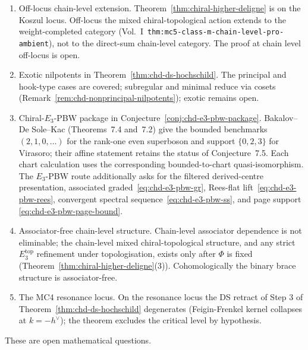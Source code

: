 \begin{enumerate}
\item Off-locus chain-level extension. Theorem~\ref{thm:chiral-higher-deligne}
is on the Koszul locus. Off-locus the mixed chiral-topological action
extends to the
weight-completed category (Vol.~I~\texttt{thm:mc5-class-m-chain-level-pro-ambient}),
not to the direct-sum chain-level category. The proof at chain level
off-locus is open.

\item Exotic nilpotents in Theorem~\ref{thm:chd-ds-hochschild}. The
principal and hook-type cases are covered; subregular and minimal
reduce via cosets (Remark~\ref{rem:chd-nonprincipal-nilpotents}); exotic
remains open.

\item Chiral-$E_3$-PBW package in
Conjecture~\ref{conj:chd-e3-pbw-package}. Bakalov--De Sole--Kac
\cite{BDSK21} \textup{(}Theorems~7.4 and~7.2\textup{)} give the bounded
benchmarks $(2,1,0,\ldots)$ for the rank-one even superboson and
support $\{0,2,3\}$ for Virasoro; their affine statement retains the
status of Conjecture~7.5. Each chart calculation uses the
corresponding bounded-to-chart quasi-isomorphism.  The $E_3$-PBW route
additionally asks for the filtered derived-centre presentation,
associated graded~\eqref{eq:chd-e3-pbw-gr}, Rees-flat
lift~\eqref{eq:chd-e3-pbw-rees}, convergent spectral
sequence~\eqref{eq:chd-e3-pbw-ss}, and page support
\eqref{eq:chd-e3-pbw-page-bound}.

\item Associator-free chain-level structure. Chain-level associator
dependence is not eliminable; the chain-level mixed
chiral-topological structure, and any strict $E_3^{\mathrm{top}}$
refinement under topologisation, exists only after $\Phi$ is fixed
(Theorem~\ref{thm:chiral-higher-deligne}(3)). Cohomologically the
binary brace structure is associator-free.

\item The MC4 resonance locus. On the resonance locus the DS retract
of Step 3 of Theorem~\ref{thm:chd-ds-hochschild} degenerates
(Feigin-Frenkel kernel collapses at $k = -h^\vee$); the theorem
excludes the critical level by hypothesis.
\end{enumerate}

These are open mathematical questions.

